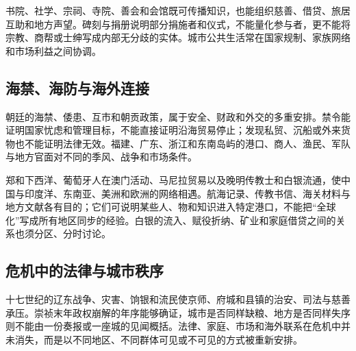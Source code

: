 书院、社学、宗祠、寺院、善会和会馆既可传播知识，也能组织慈善、借贷、旅居互助和地方声望。碑刻与捐册说明部分捐施者和仪式，不能量化参与者，更不能将宗教、商帮或士绅写成内部无分歧的实体。城市公共生活常在国家规制、家族网络和市场利益之间协调。

\subsection{海禁、海防与海外连接}

朝廷的海禁、倭患、互市和朝贡政策，属于安全、财政和外交的多重安排。禁令能证明国家忧虑和管理目标，不能直接证明沿海贸易停止；发现私贸、沉船或外来货物也不能证明法律无效。福建、广东、浙江和东南岛屿的港口、商人、渔民、军队与地方官面对不同的季风、战争和市场条件。

郑和下西洋、葡萄牙人在澳门活动、马尼拉贸易以及晚明传教士和白银流通，使中国与印度洋、东南亚、美洲和欧洲的网络相遇。航海记录、传教书信、海关材料与地方文献各有目的；它们可说明某些人、物和知识进入特定港口，不能把“全球化”写成所有地区同步的经验。白银的流入、赋役折纳、矿业和家庭借贷之间的关系也须分区、分时讨论。

\subsection{危机中的法律与城市秩序}

十七世纪的辽东战争、灾害、饷银和流民使京师、府城和县镇的治安、司法与慈善承压。崇祯末年政权崩解的年序能够确证，城市是否同样缺粮、地方是否同样失序则不能由一份奏报或一座城的见闻概括。法律、家庭、市场和海外联系在危机中并未消失，而是以不同地区、不同群体可见或不可见的方式被重新安排。
